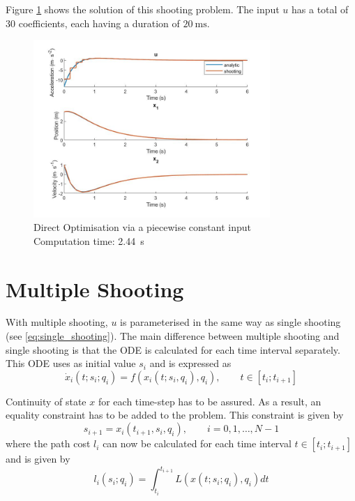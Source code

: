 \par Figure \ref{fig:solution_zoh} shows the solution of this shooting problem. The input $u$ has a total of 30 coefficients, each having a duration of $\SI{20}{\milli\second}$.

\begin{figure}[h!]
\centering
\includegraphics[width=0.8\textwidth]{Images/solution_zoh.jpg}
\caption{Direct Optimisation via a piecewise constant input\\ Computation time: \SI{2.44}{\second}}
\label{fig:solution_zoh}
\end{figure}


\section{Multiple Shooting}

\par With multiple shooting, $u$ is parameterised in the same way as single shooting (see \ref{eq:single_shooting}). The main difference between multiple shooting and single shooting is that the ODE is calculated for each time interval separately. This ODE uses as initial value $s_i$ and is expressed as
\begin{equation}
    \dot{x}_i (t; s_i; q_i) = f(x_i(t;s_i,q_i),q_i), \qquad t\in [t_i; t_{i+1}]
    \label{eq:ode_multiple}
\end{equation}

\par Continuity of state $x$ for each time-step has to be assured. As a result, an equality constraint has to be added to the problem. This constraint is given by 
\begin{equation}
    \label{eq:shooting_constraint}
    s_{i+1} = x_i (t_{i+1}, s_i, q_i), \qquad i = 0,1,\dots, N-1
\end{equation}
where the path cost $l_i$ can now be calculated for each time interval $t \in [t_i; t_{i+1}]$ and is given by
\begin{equation}
    l_i(s_i;q_i) = \int_{t_i}^{t_{i+1}} L(x(t;s_i;q_i),q_i)dt 
\end{equation}

